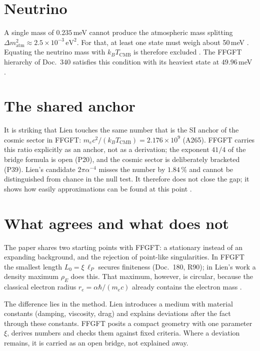 \section{Neutrino}

A single mass of $0.235$\,meV cannot produce the atmospheric mass splitting
$\Delta m^2_\text{atm}\approx2.5\times10^{-3}\,\text{eV}^2$. For that, at least
one state must weigh about 50\,meV \KM. Equating the neutrino mass with
$k_BT_\text{CMB}$ is therefore excluded \XM. The FFGFT hierarchy of Doc.~340
satisfies this condition with its heaviest state at $49.96$\,meV \KM.

\section{The shared anchor}

It is striking that Lien touches the same number that is the SI anchor of
the cosmic sector in FFGFT: $m_ec^2/(k_BT_\text{CMB})=2.176\times10^9$ (A265).
FFGFT carries this ratio explicitly as an anchor, not as a derivation; the
exponent $41/4$ of the bridge formula is open (P20), and the cosmic sector
is deliberately bracketed (P39). Lien's candidate $2\pi\alpha^{-4}$ misses the
number by $1.84\,\%$ and cannot be distinguished from chance in the null
test. It therefore does not close the gap; it shows how easily
approximations can be found at this point \SM.

\section{What agrees and what does not}

The paper shares two starting points with FFGFT: a stationary instead of an
expanding background, and the rejection of point-like singularities. In
FFGFT the smallest length $L_0=\xi\,\ell_P$ secures finiteness (Doc.~180,
R90); in Lien's work a density maximum $\rho_E$ does this. That maximum,
however, is circular, because the classical electron radius
$r_e=\alpha\hbar/(m_ec)$ already contains the electron mass \KM.

The difference lies in the method. Lien introduces a medium with material
constants (damping, viscosity, drag) and explains deviations after the fact
through these constants. FFGFT posits a compact geometry with one parameter
$\xi$, derives numbers and checks them against fixed criteria. Where a
deviation remains, it is carried as an open bridge, not explained away.

